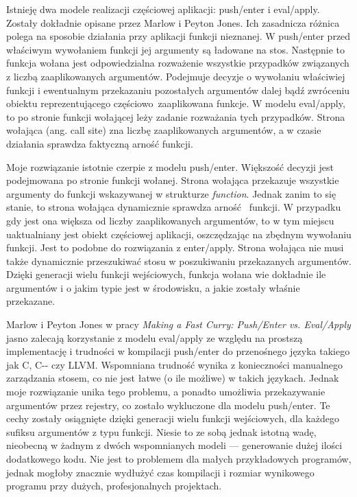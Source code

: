 \documentclass[declaration,shortabstract]{iithesis}
\begin{document}
Istnieję dwa modele realizacji częściowej aplikacji: push/enter i eval/apply. 
Zostały dokładnie opisane przez Marlow i Peyton Jones\cite{fast_curry}. 
Ich zasadnicza różnica polega na sposobie działania przy aplikacji funkcji 
nieznanej. W push/enter przed właściwym wywołaniem funkcji jej argumenty są 
ładowane na stos. Następnie to funkcja wołana jest odpowiedzialna 
rozważenie wszystkie przypadków związanych z liczbą zaaplikowanych argumentów.
Podejmuje decyzje o wywołaniu właściwiej funkcji i ewentualnym przekazaniu 
pozostałych argumentów dalej bądź zwróceniu obiektu reprezentującego częściowo\
zaaplikowana funkcje. W modelu eval/apply, to po stronie funkcji wołającej 
leży zadanie rozważania tych przypadków. Strona wołająca (ang. call site)
zna liczbę zaaplikowanych argumentów, a w czasie działania sprawdza 
faktyczną arność funkcji. 

Moje rozwiązanie istotnie czerpie z modelu push/enter. Większość decyzji
jest podejmowana po stronie funkcji wołanej. Strona wołająca przekazuje 
wszystkie argumenty do funkcji wskazywanej w strukturze \textit{function}. 
Jednak zanim to się stanie, to strona wołająca dynamicznie sprawdza arność 
funkcji. W przypadku gdy jest ona większa od liczby zaaplikowanych argumentów, 
to w tym miejscu uaktualniany jest obiekt częściowej aplikacji, oszczędzając 
na zbędnym wywołaniu funkcji. Jest to podobne do rozwiązania z enter/apply.
Strona wołająca nie musi także dynamicznie przeszukiwać stosu w poszukiwaniu 
przekazanych argumentów. Dzięki generacji wielu funkcji wejściowych, funkcja 
wołana wie dokładnie ile argumentów i o jakim typie jest w środowisku, a jakie 
zostały właśnie przekazane. 

Marlow i Peyton Jones w pracy \textit{Making a Fast Curry: Push/Enter vs.
Eval/Apply} jasno zalecają korzystanie z modelu eval/apply ze względu na 
prostszą implementację i trudności w kompilacji push/enter do przenośnego 
języka takiego jak C, C-{}- czy LLVM. Wspomniana trudność wynika z 
konieczności manualnego zarządzania stosem, co nie jest łatwe (o ile możliwe) 
w takich językach. Jednak moje rozwiązanie unika tego problemu, a ponadto
umożliwia przekazywanie argumentów przez rejestry, co zostało wykluczone dla 
modelu push/enter. Te cechy zostały osiągnięte dzięki generacji wielu funkcji 
wejściowych, dla każdego sufiksu argumentów z typu funkcji. Niesie to ze sobą 
jednak istotną wadę, nieobecną w żadnym z dwóch wspomnianych modeli --- 
generowanie dużej ilości dodatkowego kodu. Nie jest to problemem dla małych 
przykładowych programów, jednak mogłoby znacznie wydłużyć czas kompilacji i 
rozmiar wynikowego programu przy dużych, profesjonalnych projektach.
\end{document}
